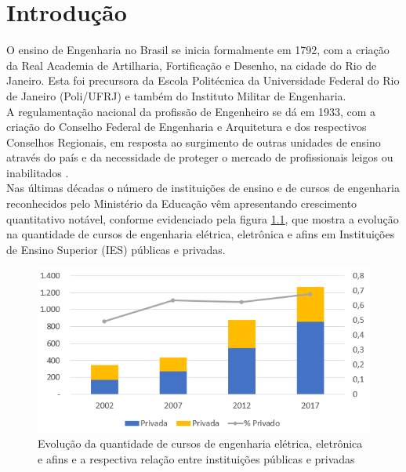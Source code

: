 \chapter{Introdução} \label{ch:intro}

	O ensino de Engenharia no Brasil se inicia formalmente em 1792, com a criação da Real Academia de Artilharia, Fortificação e Desenho, na cidade do Rio de Janeiro. Esta foi precursora da Escola Politécnica da Universidade Federal do Rio de Janeiro (Poli/UFRJ) e também do Instituto Militar de Engenharia.\\
	
	
	A regulamentação nacional da profissão de Engenheiro se dá em 1933, com a criação do Conselho Federal de Engenharia e Arquitetura e dos respectivos Conselhos Regionais, em resposta ao surgimento de outras unidades de ensino através do país e da necessidade de proteger o mercado de profissionais leigos ou inabilitados \cite{historia-confea}.\\
	
	Nas últimas décadas o número de instituições de ensino e de cursos de engenharia reconhecidos pelo Ministério da Educação vêm apresentando crescimento quantitativo notável, conforme evidenciado pela figura \ref{fig:evolucaocursosengenharias}, que mostra a evolução na quantidade de cursos de engenharia elétrica, eletrônica e afins em Instituições de Ensino Superior (IES) públicas e privadas.\\
	
	\begin{figure}[h!]
		\centering
		\includegraphics[width=0.75\linewidth]{Figuras/evolucao_cursos_engenharias}
		\caption[Evolução da quantidade de cursos de engenharia elétrica, eletrônica e afins]{Evolução da quantidade de cursos de engenharia elétrica, eletrônica e afins e a respectiva relação entre instituições públicas e privadas}
		\label{fig:evolucaocursosengenharias}
	\end{figure}
	
